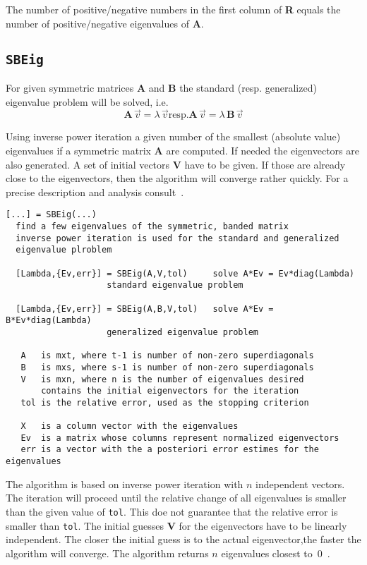 \documentclass[11pt]{article}
\begin{document}
The number of positive/negative numbers in the first column of \textbf{R}
equals the number of positive/negative eigenvalues of \textbf{A}.


\subsection{\texttt{SBEig}}
For given symmetric matrices \textbf{A} and \textbf{B} the standard
(resp. generalized) eigenvalue problem will be solved, i.e.
\[ \mathbf{A}\,\vec v=\lambda\,\vec v \text{resp.}
   \mathbf{A}\,\vec v=\lambda\,\mathbf{B}\,\vec v  \]

Using inverse power iteration a given number of the smallest (absolute value)
eigenvalues if a symmetric matrix \textbf{A} are computed. If needed the
eigenvectors are also generated.  A set of initial vectors \textbf{V} have to
be given. If those are already close to the eigenvectors, then the algorithm
will converge rather quickly. For a precise description and analysis
consult~\cite{GoluVanLoan96}.
\begin{verbatim}
[...] = SBEig(...)
  find a few eigenvalues of the symmetric, banded matrix
  inverse power iteration is used for the standard and generalized
  eigenvalue plroblem

  [Lambda,{Ev,err}] = SBEig(A,V,tol)     solve A*Ev = Ev*diag(Lambda)
                    standard eigenvalue problem

  [Lambda,{Ev,err}] = SBEig(A,B,V,tol)   solve A*Ev = B*Ev*diag(Lambda)
                    generalized eigenvalue problem

   A   is mxt, where t-1 is number of non-zero superdiagonals
   B   is mxs, where s-1 is number of non-zero superdiagonals
   V   is mxn, where n is the number of eigenvalues desired
       contains the initial eigenvectors for the iteration
   tol is the relative error, used as the stopping criterion

   X   is a column vector with the eigenvalues
   Ev  is a matrix whose columns represent normalized eigenvectors
   err is a vector with the a posteriori error estimes for the eigenvalues
\end{verbatim}

The algorithm is based on inverse power iteration 
  with $n$ independent vectors.
The iteration will proceed until the relative change of all eigenvalues is
smaller than the given value of \texttt{tol}. This doe not guarantee that the
relative error is smaller than \texttt{tol}.  The initial guesses \textbf{V}
for the eigenvectors have to be linearly independent. The closer the initial
guess is to the actual eigenvector,the faster the algorithm will converge. 
The algorithm returns $n$ eigenvalues closest to~0~.
\end{document}
